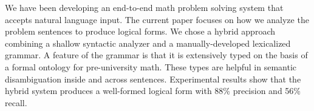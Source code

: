 We have been developing an end-to-end math problem solving system that accepts natural language input. The current paper focuses on how we analyze the problem sentences to produce logical forms. We chose a hybrid approach combining a shallow syntactic analyzer and a manually-developed lexicalized grammar. A feature of the grammar is that it is extensively typed on the basis of a formal ontology for pre-university math. These types are helpful in semantic disambiguation inside and across sentences. Experimental results show that the hybrid system produces a well-formed logical form with 88\% precision and 56\% recall.
